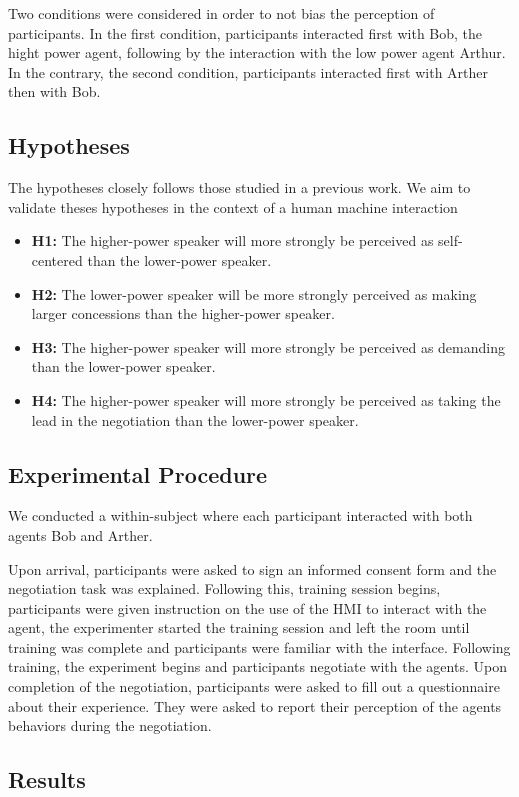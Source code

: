 \documentclass[runningheads,a4paper]{llncs}
\begin{document}
		Two conditions were considered in order to not bias the perception of participants. In the first condition, participants interacted first with Bob, the hight power agent, following by the interaction with the low power agent Arthur. In the contrary, the second condition, participants interacted first with Arther then with Bob. 
		 
		\subsection{Hypotheses}
			The hypotheses closely follows those studied in a previous work. We aim to validate theses hypotheses in the context of a human machine interaction
			
			\begin{itemize}
					\item  \textbf{H1:} The higher-power speaker will more strongly be perceived as self-centered than the lower-power speaker.  
					
					\item \textbf{H2:} The lower-power speaker will be more strongly perceived as making larger concessions than the higher-power speaker.
					
					\item \textbf{H3:}  The higher-power speaker will more strongly be perceived as demanding than the lower-power speaker.
					
					\item \textbf{H4:}  The higher-power speaker will more strongly be perceived as taking the lead in the negotiation than the lower-power speaker.
					
				\end{itemize}
				
		\subsection{Experimental Procedure}
		We conducted a within-subject where each participant interacted with both  agents Bob and Arther.
		
		
		Upon arrival, participants were asked to sign an informed consent form and the negotiation task was explained. Following this, training session begins, participants were given instruction on the use of the HMI to interact with the agent, the experimenter started the training session and left the room until training was complete and participants were familiar with the interface. Following training, the experiment begins and participants negotiate with the agents. Upon completion of the negotiation, participants were asked to fill out a questionnaire about their experience. They were asked to report their perception of the agents behaviors during the negotiation. 
		
		\subsection{Results}
		
		
\scriptsize{	
	
	}
\end{document}
